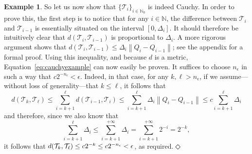 \documentclass[10pt,a4paper]{paper}
\theoremstyle{definition}
\newtheorem{exmp}{Example}%
\newcommand{\nats}{\mathbb{N}}
\newcommand{\norm}[1]{\left\lVert #1 \right\rVert}
\newcommand{\coloneqq}{:\!=}
\newcommand{\exampleend}{\hfill$\Diamond$}
\begin{document}
\begin{exmp}
So let us now show that $\{\mathcal{T}_i\}_{i\in\nats_0}$ is indeed Cauchy. In order to prove this, the first step is to notice that for any $i\in\nats$, the difference between $\mathcal{T}_{i}$ and $\mathcal{T}_{i-1}$ is essentially situated on the interval $[0,\Delta_i]$. It should therefore be intuitively clear that $d(\mathcal{T}_i,\mathcal{T}_{i-1})$ is proportional to $\Delta_i$. A more rigorous argument shows that $d(\mathcal{T}_i,\mathcal{T}_{i-1})\leq\Delta_i\norm{Q_i-Q_{i-1}}$; see the appendix for a formal proof.
Using this inequality, and because $d$ is a metric, Equation~\eqref{eq:cauchyexample} can now easily be proven. It suffices to choose $n_\epsilon$ in such a way that $c2^{-n_\epsilon}<\epsilon$. Indeed, in that case, for any $k,\ell>n_\epsilon$, if we assume---without loss of generality---that $k\leq\ell$, it follows that
 \begin{equation*}
d(\mathcal{T}_{k},\mathcal{T}_\ell)
\leq\sum_{i=k+1}^{\ell}d(\mathcal{T}_{i-1},\mathcal{T}_i)
\leq\sum_{i=k+1}^{\ell}\Delta_i\norm{Q_i-Q_{i-1}}
\leq c\sum_{i=k+1}^{\ell}\Delta_i
 \end{equation*}
and therefore, since we also know that
\begin{equation*}
\sum_{i=k+1}^{\ell}\Delta_i
\leq
\sum_{i=k+1}^{+\infty}\Delta_i
=\sum_{i=k+1}^{+\infty}2^{-i}
=2^{-k},
\end{equation*}
it follows that $\smash{d(\mathcal{T}_{k},\mathcal{T}_\ell)\leq c 2^{-k}\leq c 2^{-n_\epsilon}}<\epsilon$, as required.\exampleend
\end{exmp}
\end{document}
